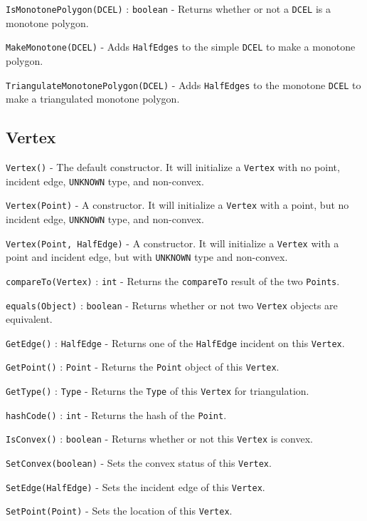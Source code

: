 \documentclass[11pt]{article}
\begin{document}
\texttt{IsMonotonePolygon(DCEL)} : \texttt{boolean} - Returns whether or not a \texttt{DCEL} is a monotone polygon.

\texttt{MakeMonotone(DCEL)} - Adds \texttt{HalfEdges} to the simple \texttt{DCEL} to make a monotone polygon.

\texttt{TriangulateMonotonePolygon(DCEL)} - Adds \texttt{HalfEdges} to the monotone \texttt{DCEL} to make a triangulated monotone polygon.

\subsection{Vertex}
\label{sec:vertex}

\texttt{Vertex()} - The default constructor. It will initialize a \texttt{Vertex} with no point, incident edge, \texttt{UNKNOWN} type, and non-convex.

\texttt{Vertex(Point)} - A constructor. It will initialize a \texttt{Vertex} with a point, but no incident edge, \texttt{UNKNOWN} type, and non-convex.

\texttt{Vertex(Point, HalfEdge)} - A constructor. It will initialize a \texttt{Vertex} with a point and incident edge, but with \texttt{UNKNOWN} type and non-convex.

\texttt{compareTo(Vertex)} : \texttt{int} - Returns the \texttt{compareTo} result of the two \texttt{Points}.

\texttt{equals(Object)} : \texttt{boolean} - Returns whether or not two \texttt{Vertex} objects are equivalent.

\texttt{GetEdge()} : \texttt{HalfEdge} - Returns one of the \texttt{HalfEdge} incident on this \texttt{Vertex}.

\texttt{GetPoint()} : \texttt{Point} - Returns the \texttt{Point} object of this \texttt{Vertex}.

\texttt{GetType()} : \texttt{Type} - Returns the \texttt{Type} of this \texttt{Vertex} for triangulation.

\texttt{hashCode()} : \texttt{int} - Returns the hash of the \texttt{Point}.

\texttt{IsConvex()} : \texttt{boolean} - Returns  whether or not this \texttt{Vertex} is convex.

\texttt{SetConvex(boolean)} - Sets the convex status of this \texttt{Vertex}.

\texttt{SetEdge(HalfEdge)} - Sets the incident edge of this \texttt{Vertex}.

\texttt{SetPoint(Point)} - Sets the location of this \texttt{Vertex}.
\end{document}
